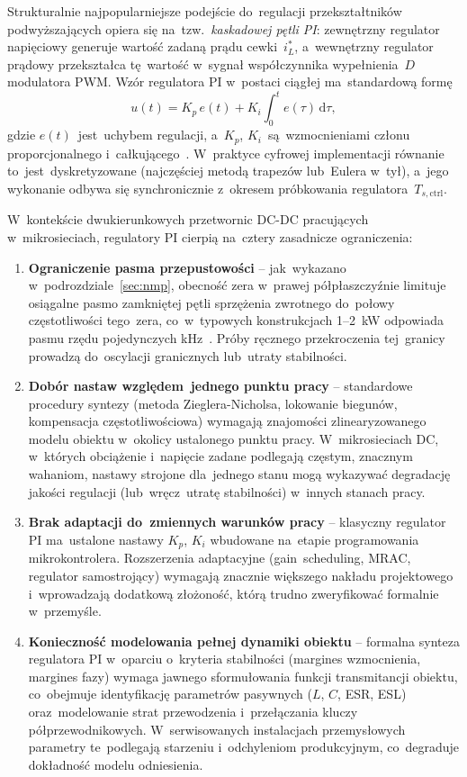 Strukturalnie najpopularniejsze podejście do~regulacji przekształtników podwyższających opiera się na~tzw.~\emph{kaskadowej pętli PI}: zewnętrzny regulator napięciowy generuje wartość zadaną prądu cewki~$i_L^{*}$, a~wewnętrzny regulator prądowy przekształca tę~wartość w~sygnał współczynnika wypełnienia~$D$ modulatora PWM. Wzór regulatora PI w~postaci ciągłej ma~standardową formę
\begin{equation}
    u(t) = K_p\,e(t) + K_i\int_0^{t} e(\tau)\,\mathrm{d}\tau,
    \label{eq:pi-cont}
\end{equation}
gdzie $e(t)$~jest~uchybem regulacji, a~$K_p$, $K_i$~są~wzmocnieniami członu proporcjonalnego i~całkującego~\cite{astrom2008}. W~praktyce cyfrowej implementacji równanie to~jest~dyskretyzowane (najczęściej metodą trapezów lub~Eulera w~tył), a~jego wykonanie odbywa się synchronicznie z~okresem próbkowania regulatora~$T_{s,\mathrm{ctrl}}$.

W~kontekście dwukierunkowych przetwornic DC-DC pracujących w~mikrosieciach, regulatory PI cierpią na~cztery zasadnicze ograniczenia:
\begin{enumerate}
    \item \textbf{Ograniczenie pasma przepustowości} -- jak~wykazano w~podrozdziale~\ref{sec:nmp}, obecność zera w~prawej półpłaszczyźnie limituje osiągalne pasmo zamkniętej pętli sprzężenia zwrotnego do~połowy częstotliwości tego~zera, co~w~typowych konstrukcjach 1--2~kW odpowiada pasmu rzędu pojedynczych kHz~\cite{erickson2020}. Próby ręcznego przekroczenia tej~granicy prowadzą do~oscylacji granicznych lub~utraty stabilności.
    \item \textbf{Dobór nastaw względem~jednego punktu pracy} -- standardowe procedury syntezy (metoda Zieglera-Nicholsa, lokowanie biegunów, kompensacja częstotliwościowa) wymagają znajomości zlinearyzowanego modelu obiektu w~okolicy ustalonego punktu pracy. W~mikrosieciach DC, w~których obciążenie i~napięcie zadane podlegają częstym, znacznym wahaniom, nastawy strojone dla~jednego stanu mogą wykazywać degradację jakości regulacji (lub~wręcz~utratę stabilności) w~innych stanach pracy.
    \item \textbf{Brak adaptacji do~zmiennych warunków pracy} -- klasyczny regulator PI ma~ustalone nastawy $K_p$, $K_i$ wbudowane na~etapie programowania mikrokontrolera. Rozszerzenia adaptacyjne (gain~scheduling, MRAC, regulator samostrojący) wymagają znacznie większego nakładu projektowego i~wprowadzają dodatkową złożoność, którą trudno zweryfikować formalnie w~przemyśle.
    \item \textbf{Konieczność modelowania pełnej dynamiki obiektu} -- formalna synteza regulatora PI w~oparciu o~kryteria stabilności (margines wzmocnienia, margines fazy) wymaga jawnego sformułowania funkcji transmitancji obiektu, co~obejmuje identyfikację parametrów pasywnych ($L$, $C$, ESR, ESL) oraz~modelowanie strat przewodzenia i~przełączania kluczy półprzewodnikowych. W~serwisowanych instalacjach przemysłowych parametry te~podlegają starzeniu i~odchyleniom produkcyjnym, co~degraduje dokładność modelu odniesienia.
\end{enumerate}

